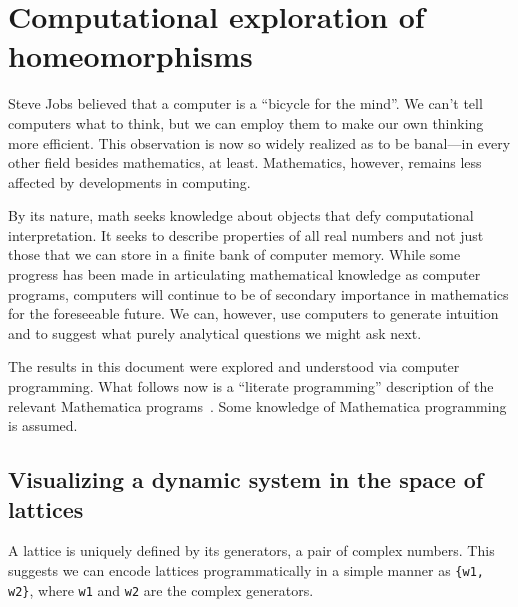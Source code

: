 \documentclass[12pt,twoside]{reedthesis}
\theoremstyle{definition}
\begin{document}
\chapter{Computational exploration of homeomorphisms}


Steve Jobs believed that a computer is a ``bicycle for the mind''\cite{krainin1990}.
We can't tell computers what to think, but we can employ them to make our own thinking more efficient.
This observation is now so widely realized as to be banal---in every other field besides mathematics, at least.
Mathematics, however, remains less affected by developments in computing.

By its nature, math seeks knowledge about objects that defy computational interpretation.
It seeks to describe properties of all real numbers and not just those that we can store in a finite bank of computer memory.
While some progress has been made in articulating mathematical knowledge as computer programs, computers will continue to be of secondary importance in mathematics for the foreseeable future.
We can, however, use computers to generate intuition and to suggest what purely analytical questions we might ask next.

The results in this document were explored and understood via computer programming.
What follows now is a ``literate programming'' description of the relevant Mathematica programs~\cite{knuth1992}.
Some knowledge of Mathematica programming is assumed.

\newpage

\section{Visualizing a dynamic system in the space of lattices}

A lattice is uniquely defined by its generators, a pair of complex numbers.
This suggests we can encode lattices programmatically in a simple manner as \texttt{\{w1, w2\}}, where \texttt{w1} and \texttt{w2} are the complex generators. 
\end{document}
